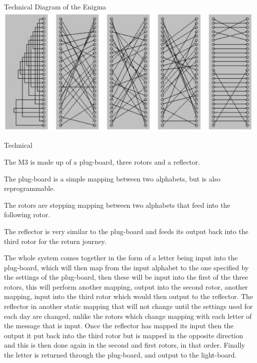 \documentclass[final]{beamer}
\begin{document}
\begin{frame}{}
\begin{columns}[t]
\begin{column}{.32\linewidth}
        \begin{block}{Technical Diagram of the Enigma}
          \includegraphics[width=\columnwidth]{enigma.png} 
        \end{block}
        
         \begin{block}{Technical}
          \begin{itemize} \small{
          \item The M3 is made up of a plug-board, three rotors and a reflector.
          \item The plug-board is a simple mapping between two alphabets, but is also reprogrammable.
          \item The rotors are stepping mapping between two alphabets that feed into the following rotor.
          \item The reflector is very similar to the plug-board and feeds its output back into the third rotor for the return journey.
          \item The whole system comes together in the form of a letter being input into the plug-board, which will then map from the input alphabet to the one specified by the settings of the plug-board, then these will be input into the first of the three rotors, this will perform another mapping, output into the second rotor, another mapping, input into the third rotor which would then output to the reflector. The reflector in another static mapping that will not change until the settings used for each day are changed, unlike the rotors which change mapping with each letter of the message that is input. Once the reflector has mapped its input then the output it put back into the third rotor but is mapped in the opposite direction and this is then done again in the second and first rotors, in that order. Finally the letter is returned through the plug-board, and output to the light-board.}
          \end{itemize}
        \end{block}


\end{column}
\end{columns}
\end{frame}
\end{document}
